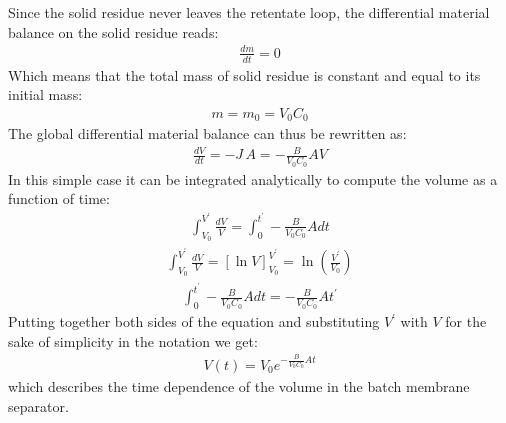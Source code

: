 \documentclass[letterpaper,10pt,english]{jupyterBook}
\begin{document}
\sphinxAtStartPar
Since the solid residue never leaves the retentate loop,  the differential material balance on the solid residue reads:
\begin{equation}\label{equation:Process_layouts:PLYeq3}
\begin{split}
\frac{dm}{dt}=0 
\end{split}
\end{equation}
\sphinxAtStartPar
Which means that the total mass of solid residue is constant and equal to its initial mass:
\begin{equation}\label{equation:Process_layouts:PLYeq4}
\begin{split}
m=m_0=V_0C_0 
\end{split}
\end{equation}
\sphinxAtStartPar
The global differential material balance can thus be rewritten as:
\begin{equation}\label{equation:Process_layouts:PLYeq5}
\begin{split}
\frac{dV}{dt}=-J\,A=-\frac{B}{V_0C_0 }AV
\end{split}
\end{equation}
\sphinxAtStartPar
In this simple case it can be integrated analytically to compute the volume as a function of time:
\begin{equation}\label{equation:Process_layouts:PLYeq6}
\begin{split}
\int_{V_0}^{V^{\prime}}\frac{dV}{V}=\int_0^{t^{\prime}}-\frac{B}{V_0C_0 }Adt
\end{split}
\end{equation}\begin{equation}\label{equation:Process_layouts:PLYeq7}
\begin{split}
\int_{V_0}^{V^{\prime}}\frac{dV}{V}=\left[\ln{V}\right]^{V^{\prime}}_{V_0}=\ln\left(\frac{V^\prime}{V_0}\right)
\end{split}
\end{equation}\begin{equation}\label{equation:Process_layouts:PLYeq8}
\begin{split}
\int_0^{t^{\prime}}-\frac{B}{V_0C_0 }Adt=-\frac{B}{V_0C_0 }At^\prime
\end{split}
\end{equation}
\sphinxAtStartPar
Putting together both sides of the equation and substituting \(V^\prime\) with \(V\) for the sake of simplicity in the notation we get:
\begin{equation}\label{equation:Process_layouts:PLYeq9}
\begin{split}
V(t)=V_0e^{-\frac{B}{V_0C_0 }At}
\end{split}
\end{equation}
\sphinxAtStartPar
which describes the time dependence of the volume in the batch membrane separator.
\end{document}
